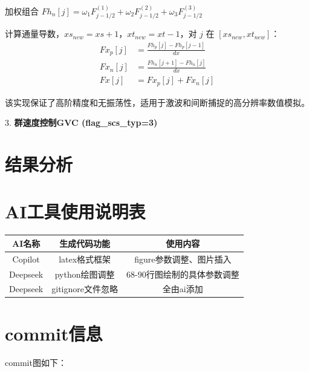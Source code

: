 \documentclass[12pt,a4paper]{article}
\begin{document}
加权组合 $Fh_n[j] = \omega_1 F^{(1)}_{j-1/2} + \omega_2 F^{(2)}_{j-1/2} + \omega_3 F^{(3)}_{j-1/2}$

计算通量导数，$xs_{new}=xs+1$，$xt_{new}=xt-1$，对 $j$ 在 $[xs_{new}, xt_{new}]$：
\begin{align*}
    Fx_p[j] &= \frac{Fh_p[j] - Fh_p[j-1]}{dx} \\
    Fx_n[j] &= \frac{Fh_n[j+1] - Fh_n[j]}{dx} \\
    Fx[j] &= Fx_p[j] + Fx_n[j]
\end{align*}

该实现保证了高阶精度和无振荡性，适用于激波和间断捕捉的高分辨率数值模拟。

3. \textbf{群速度控制GVC (flag\_scs\_typ=3)}


\newpage   
\section{结果分析}

\section{AI工具使用说明表}
\begin{table}[!htbp]
    \centering
    \begin{tabular}{|c|c|c|}
        \hline
        \textbf{AI名称} & \textbf{生成代码功能} & \textbf{使用内容} \\
        \hline
        Copilot & latex格式框架 & figure参数调整、图片插入\\
        \hline
        Deepseek & python绘图调整 & 68-90行图绘制的具体参数调整\\
        \hline
        Deepseek & gitignore文件忽略 & 全由ai添加\\
        \hline
\end{tabular}
\end{table}
\section{commit信息}
commit图如下：
\end{document}
